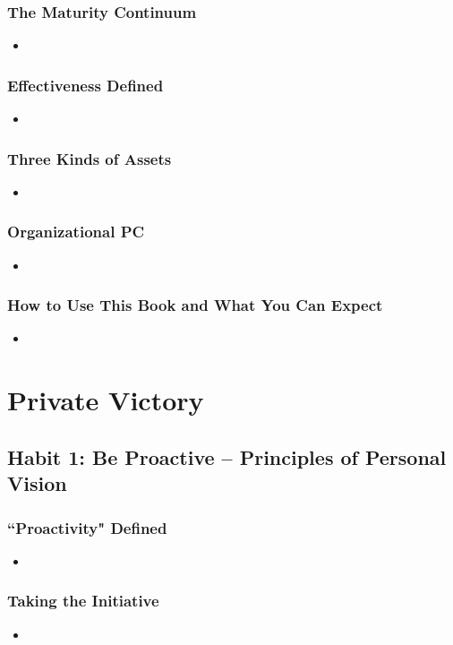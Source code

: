 \documentclass[11pt]{article}
\begin{document}
\subsubsection{The Maturity Continuum}
\begin{itemize}
\item 
\end{itemize}
\subsubsection{Effectiveness Defined}
\begin{itemize}
\item 
\end{itemize}
\subsubsection{Three Kinds of Assets}
\begin{itemize}
\item 
\end{itemize}
\subsubsection{Organizational PC}
\begin{itemize}
\item 
\end{itemize}
\subsubsection{How to Use This Book and What You Can Expect}
\begin{itemize}
\item 
\end{itemize}
\section{Private Victory}
\subsection{Habit 1: Be Proactive -- Principles of Personal Vision}
\subsubsection{``Proactivity" Defined}
\begin{itemize}
\item 
\end{itemize}
\subsubsection{Taking the Initiative}
\begin{itemize}
\item 
\end{itemize}
\end{document}
